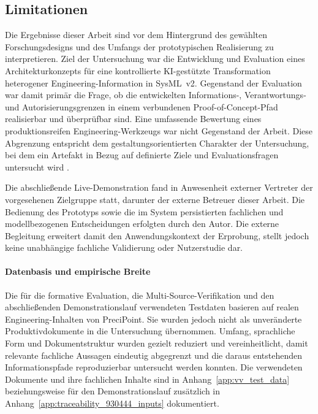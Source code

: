 \subsection{Limitationen}
\label{sec:discussion_limitations}

Die Ergebnisse dieser Arbeit sind vor dem Hintergrund des gewählten
Forschungsdesigns und des Umfangs der prototypischen Realisierung zu
interpretieren. Ziel der Untersuchung war die Entwicklung und Evaluation
eines Architekturkonzepts für eine kontrollierte KI-gestützte Transformation
heterogener Engineering-Information in SysML~v2. Gegenstand der Evaluation
war damit primär die Frage, ob die entwickelten Informations-,
Verantwortungs- und Autorisierungsgrenzen in einem verbundenen
Proof-of-Concept-Pfad realisierbar und überprüfbar sind. Eine umfassende
Bewertung eines produktionsreifen Engineering-Werkzeugs war nicht Gegenstand
der Arbeit. Diese Abgrenzung entspricht dem gestaltungsorientierten
Charakter der Untersuchung, bei dem ein Artefakt in Bezug auf definierte
Ziele und Evaluationsfragen untersucht wird
\cite{Wieringa2014,ISO42030}.

Die abschließende Live-Demonstration fand in Anwesenheit externer Vertreter
der vorgesehenen Zielgruppe statt, darunter der externe Betreuer dieser
Arbeit. Die Bedienung des Prototyps sowie die im System persistierten
fachlichen und modellbezogenen Entscheidungen erfolgten durch den Autor.
Die externe Begleitung erweitert damit den Anwendungskontext der Erprobung,
stellt jedoch keine unabhängige fachliche Validierung oder Nutzerstudie dar.

\paragraph{Datenbasis und empirische Breite}

Die für die formative Evaluation, die Multi-Source-Verifikation und den
abschließenden Demonstrationslauf verwendeten Testdaten basieren auf realen
Engineering-Inhalten von PreciPoint.
Sie wurden jedoch nicht als unveränderte Produktivdokumente in die
Untersuchung übernommen. Umfang, sprachliche Form und Dokumentstruktur wurden
gezielt reduziert und vereinheitlicht, damit relevante fachliche Aussagen
eindeutig abgegrenzt und die daraus entstehenden Informationspfade
reproduzierbar untersucht werden konnten. Die verwendeten Dokumente und ihre
fachlichen Inhalte sind in
Anhang~\ref{app:vv_test_data} beziehungsweise für den Demonstrationslauf zusätzlich
in Anhang~\ref{app:traceability_930444_inputs} dokumentiert.

